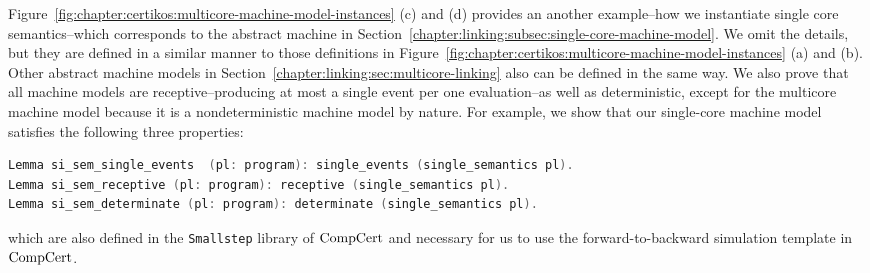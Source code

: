 Figure~\ref{fig:chapter:certikos:multicore-machine-model-instances} (c) and (d) provides an another example--how 
we instantiate single core semantics--which corresponds to the abstract machine in Section~\ref{chapter:linking:subsec:single-core-machine-model}.
We omit the details, but they are defined in a similar manner to those definitions in Figure~\ref{fig:chapter:certikos:multicore-machine-model-instances} (a) and (b). 
Other abstract machine models 
in Section~\ref{chapter:linking:sec:multicore-linking} also can be defined in
 the same way. 
We also prove that all machine models 
are receptive--producing at most a single event per one evaluation--as well as deterministic, 
except for the multicore machine model because it is a nondeterministic machine model by nature.
For example, 
we show that
our single-core machine model satisfies the following three properties:
\begin{lstlisting}[language=C]
Lemma si_sem_single_events  (pl: program): single_events (single_semantics pl).
Lemma si_sem_receptive (pl: program): receptive (single_semantics pl).
Lemma si_sem_determinate (pl: program): determinate (single_semantics pl).
\end{lstlisting}
which are also defined in  the \lstinline$Smallstep$ library of $\mathrm{CompCert}$ and
necessary for us to use 
the forward-to-backward simulation template in $\mathrm{CompCert}$. 

%
%
%

%    
%    

